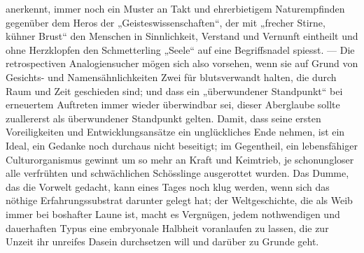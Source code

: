 anerkennt, immer noch ein Muster an Takt und ehrerbietigem Naturempfinden gegenüber dem Heros der „Geisteswissenschaften“, der mit „frecher Stirne, kühner Brust“ den Menschen in Sinnlichkeit, Verstand und Vernunft eintheilt und ohne Herzklopfen den Schmetterling „Seele“ auf eine Begriffsnadel spiesst. — Die retrospectiven Analogiensucher mögen sich also vorsehen, wenn sie auf Grund von Gesichts- und Namensähnlichkeiten Zwei für blutsverwandt halten, die durch Raum und Zeit geschieden sind; und dass ein „überwundener Standpunkt“ bei erneuertem Auftreten immer wieder überwindbar sei, dieser Aberglaube sollte zuallererst als überwundener Standpunkt gelten. Damit, dass seine ersten Voreiligkeiten und Entwicklungsansätze ein unglückliches Ende nehmen, ist ein Ideal, ein Gedanke noch durchaus nicht beseitigt; im Gegentheil, ein lebensfähiger Culturorganismus gewinnt um so mehr an Kraft und Keimtrieb, je schonungloser alle verfrühten und schwächlichen Schösslinge ausgerottet wurden. Das Dumme, das die Vorwelt gedacht, kann eines Tages noch klug werden, wenn sich das nöthige Erfahrungssubstrat darunter gelegt hat; der Weltgeschichte, die als Weib immer bei boshafter Laune ist, macht es Vergnügen, jedem nothwendigen und dauerhaften Typus eine embryonale Halbheit voranlaufen zu lassen, die zur Unzeit ihr unreifes Dasein durchsetzen will und darüber zu Grunde geht.
\par

